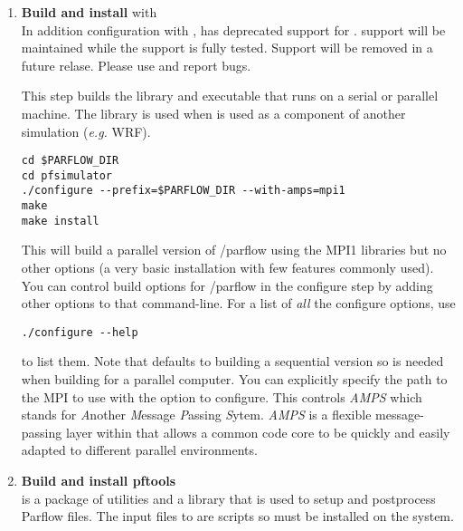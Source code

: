 \begin{enumerate}
\item {\bf Build and install \parflow{}} with \\

In addition configuration with , \parflow{} has deprecated
support for .  support will be
maintained while the  support is fully tested.  Support
will be removed in a future relase.  Please use  and
report bugs.
  
This step builds the \parflow{} library and executable that runs on
a serial or parallel machine.  The library is used when
 \parflow{} is used as a component of another simulation (\emph{e.g.}
 WRF).  

\begin{display}\begin{verbatim}
cd $PARFLOW_DIR
cd pfsimulator
./configure --prefix=$PARFLOW_DIR --with-amps=mpi1
make 
make install
\end{verbatim}\end{display}

This will build a parallel version of /parflow{} using the MPI1 
libraries but no other options (a very basic installation with few features commonly used).
You can control build options for /parflow{} in the configure step by adding other 
options to that command-line. For a list of \emph{all} the configure options, use
\begin{display}\begin{verbatim}
./configure --help 
\end{verbatim}\end{display} to list them.  Note that \parflow{} defaults to building a sequential version so
 is needed when building for a parallel computer.
  You can explicitly specify the path to the MPI to use with the
  option to configure.  This controls \emph{AMPS}
 which stands for \emph{A}nother \emph{M}essage \emph{P}assing
 \emph{S}ytem.  \emph{AMPS} is a flexible message-passing layer within
 \parflow{} that allows a common code core to be quickly and easily
 adapted to different parallel environments. 

\item {\bf Build and install pftools}\\ 
 is a package of utilities and a  library that
 is used to setup and postprocess Parflow files.  The input files to
 \parflow{} are  scripts so  must be installed on
 the system.


\end{enumerate}
